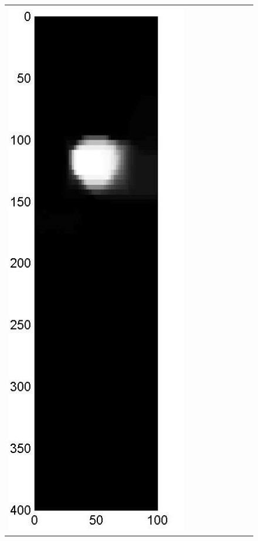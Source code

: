 \documentclass[11pt]{article}
\begin{document}
\begin{figure}[!h]
\begin{center}
\begin{tabular}{|c|c|c|c|c|c|c|c|c|}
			\includegraphics[width=.9\iwidth]{figures/newFigs/noisy/resultsExp-2-mkTV}
			&

\end{tabular}
\end{center}
\end{figure}
\end{document}
